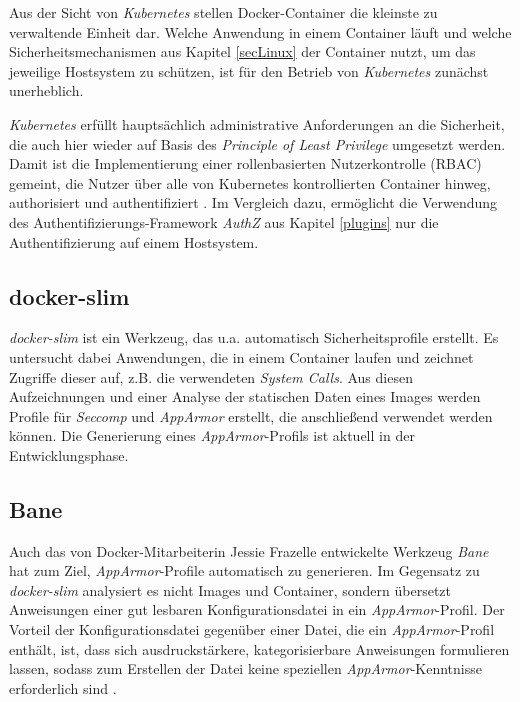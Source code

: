 \documentclass[../main.tex]{subfiles}
\begin{document}
      Aus der Sicht von \emph{Kubernetes} stellen Docker-Container die kleinste zu verwaltende Einheit dar. Welche Anwendung in einem Container läuft und welche Sicherheitsmechanismen aus Kapitel \ref{secLinux} der Container nutzt, um das jeweilige Hostsystem zu schützen, ist für den Betrieb von \emph{Kubernetes} zunächst unerheblich.

      \emph{Kubernetes} erfüllt hauptsächlich administrative Anforderungen an die Sicherheit, die auch hier wieder auf Basis des \emph{Principle of Least Privilege} umgesetzt werden. Damit ist die Implementierung einer rollenbasierten Nutzerkontrolle (\acrshort{RBAC}) gemeint, die Nutzer über alle von Kubernetes kontrollierten Container hinweg, authorisiert und authentifiziert \cite{https://github.com/kubernetes/kubernetes/blob/master/docs/design/security.md}. Im Vergleich dazu, ermöglicht die Verwendung des Authentifizierungs-Framework \emph{AuthZ} aus Kapitel \ref{plugins} nur die Authentifizierung auf einem Hostsystem.



    \subsection{docker-slim}
      \emph{docker-slim} ist ein Werkzeug, das u.a. automatisch Sicherheitsprofile erstellt. Es untersucht dabei Anwendungen, die in einem Container laufen und zeichnet Zugriffe dieser auf, z.B. die verwendeten \emph{System Calls}. Aus diesen Aufzeichnungen und einer Analyse der statischen Daten eines Images werden Profile für \emph{Seccomp} und \emph{AppArmor} erstellt, die anschließend verwendet werden können. Die Generierung eines \emph{AppArmor}-Profils ist aktuell in der Entwicklungsphase.

    \subsection{Bane}
      Auch das von Docker-Mitarbeiterin Jessie Frazelle entwickelte Werkzeug \emph{Bane} hat zum Ziel, \emph{AppArmor}-Profile automatisch zu generieren. Im Gegensatz zu \emph{docker-slim} analysiert es nicht Images und Container, sondern übersetzt Anweisungen einer gut lesbaren Konfigurationsdatei in ein \emph{AppArmor}-Profil. Der Vorteil der Konfigurationsdatei gegenüber einer Datei, die ein \emph{AppArmor}-Profil enthält, ist, dass sich ausdruckstärkere, kategorisierbare Anweisungen formulieren lassen, sodass zum Erstellen der Datei keine speziellen \emph{AppArmor}-Kenntnisse erforderlich sind \cite{https://github.com/jfrazelle/bane/blob/bbc594c9dce4351b1175737cb3b4d9ee65803648/README.md}.
\end{document}
